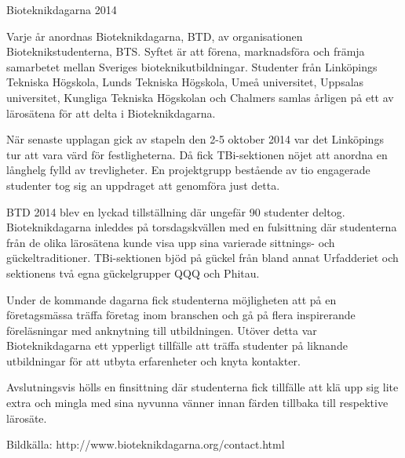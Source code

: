 Bioteknikdagarna 2014

Varje år anordnas Bioteknikdagarna, BTD, av organisationen
Bioteknikstudenterna, BTS. Syftet är att förena, marknadsföra och
främja samarbetet mellan Sveriges bioteknikutbildningar. Studenter
från Linköpings Tekniska Högskola, Lunds Tekniska Högskola, Umeå
universitet, Uppsalas universitet, Kungliga Tekniska Högskolan och
Chalmers samlas årligen på ett av lärosätena för att delta i
Bioteknikdagarna.

När senaste upplagan gick av stapeln den 2-5 oktober 2014 var det
Linköpings tur att vara värd för festligheterna. Då fick TBi-sektionen
nöjet att anordna en långhelg fylld av trevligheter.  En projektgrupp
bestående av tio engagerade studenter tog sig an uppdraget att
genomföra just detta.

BTD 2014 blev en lyckad tillställning där ungefär 90 studenter
deltog. Bioteknikdagarna inleddes på torsdagskvällen med en
fulsittning där studenterna från de olika lärosätena kunde visa upp
sina varierade sittnings- och gückeltraditioner. TBi-sektionen bjöd på
gückel från bland annat Urfadderiet och sektionens två egna
gückelgrupper QQQ och Phitau.

Under de kommande dagarna fick studenterna möjligheten att på en
företagsmässa träffa företag inom branschen och gå på flera
inspirerande föreläsningar med anknytning till utbildningen. Utöver
detta var Bioteknikdagarna ett ypperligt tillfälle att träffa
studenter på liknande utbildningar för att utbyta erfarenheter och
knyta kontakter.

Avslutningsvis hölls en finsittning där studenterna fick tillfälle att
klä upp sig lite extra och mingla med sina nyvunna vänner innan färden
tillbaka till respektive lärosäte.


Bildkälla: http://www.bioteknikdagarna.org/contact.html
